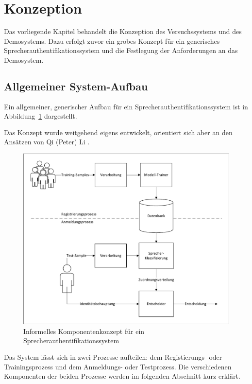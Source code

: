 \section{Konzeption}\label{sec:Konzeption}

Das vorliegende Kapitel behandelt die Konzeption des Versuchssystems und des Demosystems.
Dazu erfolgt zuvor ein grobes Konzept für ein generisches Sprecherauthentifikationssystem und die Festlegung der Anforderungen an das Demosystem.

\subsection{Allgemeiner System-Aufbau}\label{sec:allgemeiner_system_aufbau}

Ein allgemeiner, generischer Aufbau für ein Sprecherauthentifikationssystem ist in Abbildung~\ref{fig:allg-generisch-aufbau} dargestellt.

Das Konzept wurde weitgehend eigens entwickelt, orientiert sich aber an den Ansätzen von Qi (Peter) Li \autocite[vgl. ][S. 7]{li_speaker_2012}.

\begin{figure}[H]
    \centering
    \includegraphics[width=\textwidth, keepaspectratio]{images/allg-generisch-aufbau.pdf}
    \caption{Informelles Komponentenkonzept für ein Sprecherauthentifikationssystem}
    \label{fig:allg-generisch-aufbau}
\end{figure}\noindent

Das System lässt sich in zwei Prozesse aufteilen: dem Registierungs- oder Trainingsprozess und dem Anmeldungs- oder Testprozess.
Die verschiedenen Komponenten der beiden Prozesse werden im folgenden Abschnitt kurz erklärt.

